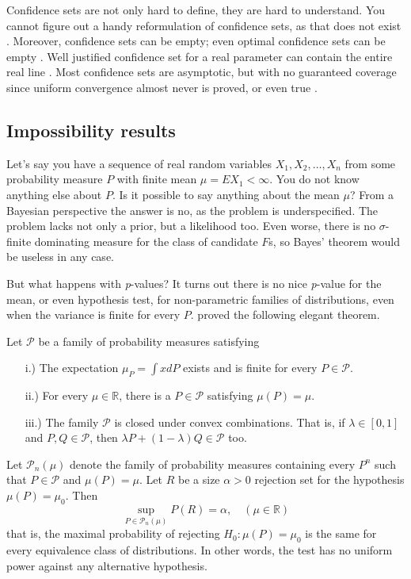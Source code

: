 Confidence sets are not only hard to define, they are hard to understand. You cannot figure out a handy reformulation of confidence sets, as that does not exist \parencite{Morey2016-ry}. Moreover, confidence sets can be empty; even optimal confidence sets can be empty \parencite[Section 3.1]{Blaker2000-ud}. Well justified confidence set for a real parameter can contain the entire real line \parencite[Section 3.2--3.3]{Blaker2000-ud}. Most confidence sets are asymptotic, but with no guaranteed coverage since uniform convergence almost never is proved, or even true \parencite{Gleser1996-kk}.

\subsection{Impossibility results}

Let's say you have a sequence of real random variables $X_{1},X_{2},\ldots,X_{n}$ from some probability measure $P$ with finite mean $\mu=EX_{1}<\infty$. You do not know anything else about $P$. Is it possible to say anything about the mean $\mu$? From a Bayesian perspective the answer is no, as the problem is underspecified. The problem lacks not only a prior, but a likelihood too. Even worse, there is no $\sigma$-finite dominating measure for the class of candidate $F$s, so Bayes' theorem would be useless in any case. 

But what happens with \emph{p}-values? It turns out there is no nice \emph{p}-value for the mean, or even hypothesis test, for non-parametric families of distributions, even when the variance is finite for every $P$. \textcite{Bahadur1956-tg} proved the following elegant theorem.
\begin{theorem}\label{thm:bahadur-savage}
Let $\mathcal{\mathcal{P}}$ be a family of probability measures
satisfying
\begin{enumerate}
\item[i.)] The expectation $\mu_{P}=\int xdP$ exists and is finite for every
$P\in\mathcal{P}$.
\item[ii.)] For every $\mu\in\mathbb{R}$, there is a $P\in\mathcal{\mathcal{P}}$
satisfying $\mu(P)=\mu$.
\item[iii.)] The family $\mathcal{\mathcal{P}}$ is closed under convex combinations.
That is, if $\lambda\in[0,1]$ and $P,Q\in\mathcal{P}$, then $\lambda P+(1-\lambda)Q\in\mathcal{P}$
too.
\end{enumerate}
Let $\mathcal{P}_{n}(\mu)$ denote the family of probability measures
containing every $P^{n}$ such that $P\in\mathcal{P}$ and $\mu(P)=\mu$.
Let $R$ be a size $\alpha>0$ rejection set for the hypothesis $\mu(P)=\mu_{0}$.
Then 
\[
\sup_{P\in\mathcal{P}_{n}(\mu)}P(R)=\alpha,\quad(\mu\in\mathbb{R})
\]
that is, the maximal probability of rejecting $H_{0}:\mu(P)=\mu_{0}$
is the same for every equivalence class of distributions. In other words,
the test has no uniform power against any alternative hypothesis. 
\end{theorem}

